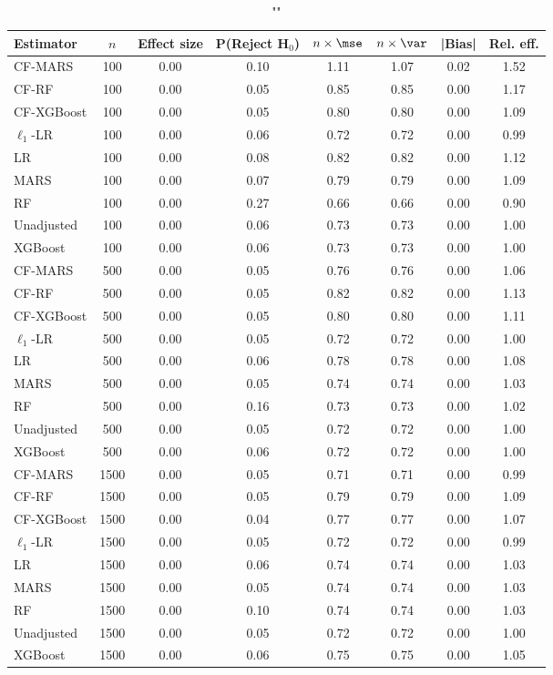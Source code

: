 \begin{table}
\centering
\caption{""}
\begin{tabular}{lccccccc}
\toprule
Estimator & $n$ & Effect size & P(Reject H$_0$) & $n\times\mse$ & $n\times \var$ & |Bias| & Rel. eff.\\ \midrule
CF-MARS & 100 & 0.00 & 0.10 & 1.11 & 1.07 & 0.02 & 1.52 \\ 
CF-RF & 100 & 0.00 & 0.05 & 0.85 & 0.85 & 0.00 & 1.17 \\ 
CF-XGBoost & 100 & 0.00 & 0.05 & 0.80 & 0.80 & 0.00 & 1.09 \\ 
$\ell_1$-LR & 100 & 0.00 & 0.06 & 0.72 & 0.72 & 0.00 & 0.99 \\ 
LR & 100 & 0.00 & 0.08 & 0.82 & 0.82 & 0.00 & 1.12 \\ 
MARS & 100 & 0.00 & 0.07 & 0.79 & 0.79 & 0.00 & 1.09 \\ 
RF & 100 & 0.00 & 0.27 & 0.66 & 0.66 & 0.00 & 0.90 \\ 
Unadjusted & 100 & 0.00 & 0.06 & 0.73 & 0.73 & 0.00 & 1.00 \\ 
XGBoost & 100 & 0.00 & 0.06 & 0.73 & 0.73 & 0.00 & 1.00 \\ \addlinespace 
CF-MARS & 500 & 0.00 & 0.05 & 0.76 & 0.76 & 0.00 & 1.06 \\ 
CF-RF & 500 & 0.00 & 0.05 & 0.82 & 0.82 & 0.00 & 1.13 \\ 
CF-XGBoost & 500 & 0.00 & 0.05 & 0.80 & 0.80 & 0.00 & 1.11 \\ 
$\ell_1$-LR & 500 & 0.00 & 0.05 & 0.72 & 0.72 & 0.00 & 1.00 \\ 
LR & 500 & 0.00 & 0.06 & 0.78 & 0.78 & 0.00 & 1.08 \\ 
MARS & 500 & 0.00 & 0.05 & 0.74 & 0.74 & 0.00 & 1.03 \\ 
RF & 500 & 0.00 & 0.16 & 0.73 & 0.73 & 0.00 & 1.02 \\ 
Unadjusted & 500 & 0.00 & 0.05 & 0.72 & 0.72 & 0.00 & 1.00 \\ 
XGBoost & 500 & 0.00 & 0.06 & 0.72 & 0.72 & 0.00 & 1.00 \\ \addlinespace 
CF-MARS & 1500 & 0.00 & 0.05 & 0.71 & 0.71 & 0.00 & 0.99 \\ 
CF-RF & 1500 & 0.00 & 0.05 & 0.79 & 0.79 & 0.00 & 1.09 \\ 
CF-XGBoost & 1500 & 0.00 & 0.04 & 0.77 & 0.77 & 0.00 & 1.07 \\ 
$\ell_1$-LR & 1500 & 0.00 & 0.05 & 0.72 & 0.72 & 0.00 & 0.99 \\ 
LR & 1500 & 0.00 & 0.06 & 0.74 & 0.74 & 0.00 & 1.03 \\ 
MARS & 1500 & 0.00 & 0.05 & 0.74 & 0.74 & 0.00 & 1.03 \\ 
RF & 1500 & 0.00 & 0.10 & 0.74 & 0.74 & 0.00 & 1.03 \\ 
Unadjusted & 1500 & 0.00 & 0.05 & 0.72 & 0.72 & 0.00 & 1.00 \\ 
XGBoost & 1500 & 0.00 & 0.06 & 0.75 & 0.75 & 0.00 & 1.05 \\
\bottomrule
\end{tabular}
\end{table}

